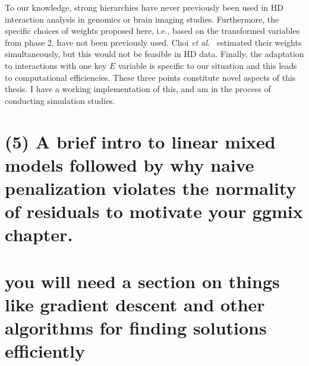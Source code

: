 To our knowledge, strong hierarchies have never previously been used in HD interaction analysis in genomics or brain imaging studies. Furthermore, the specific choices of weights proposed here, i.e., based on the transformed variables from phase 2, have not been previously used. Choi \textit{et al.}~\citep{choi2010variable} estimated their weights simultaneously, but this would not be feasible in HD data. Finally, the adaptation to interactions with one key $E$ variable is specific to our situation and this leads to computational efficiencies. These three points constitute novel aspects of this thesis. I have a working implementation of this, and am in the process of conducting simulation studies.


\section{(5) A brief intro to linear mixed models followed by why naive penalization violates the normality of residuals to motivate your ggmix chapter.}



\section{you will need a section on things like gradient descent and other algorithms for finding solutions efficiently}